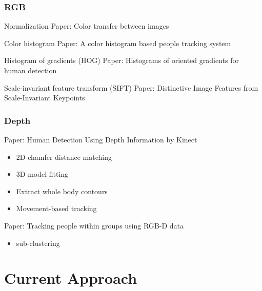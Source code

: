 \documentclass{beamer}
\begin{document}

\begin{frame}
\frametitle{RGB}
\begin{block}{Normalization}
Paper: Color transfer between images \cite{color_transfer}
\end{block}

\begin{block}{Color histogram}
Paper: A color histogram based people tracking system \cite{color_histogram}
\end{block}

\begin{block}{Histogram of gradients (HOG)}
Paper: Histograms of oriented gradients for human detection \cite{hog}
\end{block}

\begin{block}{Scale-invariant feature transform (SIFT)}
Paper: Distinctive Image Features from Scale-Invariant Keypoints \cite{sift}
\end{block}
\end{frame}

\begin{frame}
\frametitle{Depth}
Paper: Human Detection Using Depth Information by Kinect \cite{detection_depth}
\begin{itemize}
	\item 2D chamfer distance matching
	\item 3D model fitting
	\item Extract whole body contours
	\item Movement-based tracking
\end{itemize}
Paper: Tracking people within groups using RGB-D data \cite{rgbd}
\begin{itemize}
	\item sub-clustering
\end{itemize}
\end{frame}

\section{Current Approach}
\end{document}
